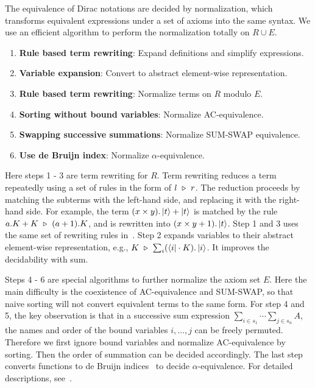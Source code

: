 The equivalence of Dirac notations are decided by normalization, which transforms equivalent expressions under a set of axioms into the same syntax. We use an efficient algorithm to perform the normalization totally on $R \cup E$.

\begin{enumerate}
    \item \textbf{Rule based term rewriting}: Expand definitions and simplify expressions.
    \item \textbf{Variable expansion}: Convert to abstract element-wise representation.
    \item \textbf{Rule based term rewriting}: Normalize terms on \( R \) modulo \( E \).
    \item \textbf{Sorting without bound variables}: Normalize AC-equivalence.
    \item \textbf{Swapping successive summations}: Normalize SUM-SWAP equivalence.
    \item \textbf{Use de Bruijn index}: Normalize \( \alpha \)-equivalence.
\end{enumerate}

Here steps 1 - 3 are term rewriting for $R$. 
Term rewriting reduces a term repeatedly using a set of rules in the form of $l\ \triangleright\ r$. The reduction proceeds by matching the subterms with the left-hand side, and replacing it with the right-hand side. 
For example, the term $(x\times y) . \ket{t} + \ket{t}$ is matched by the rule $a.K + K\ \triangleright\ (a + 1).K$, and is rewritten into $(x\times y + 1) . \ket{t}$.
Step 1 and 3 uses the same set of rewriting rules in~.
Step 2 expands variables to their abstract element-wise representation, e.g., $K \ \triangleright\ \sum_{i} (\bra{i} \cdot K). \ket{i}$. It improves the decidability with sum. 


Steps 4 - 6 are special algorithms to further normalize the axiom set $E$.
Here the main difficulty is the coexistence of AC-equivalence and SUM-SWAP, so that naive sorting will not convert equivalent terms to the same form.
For step 4 and 5, the key observation is that in a successive sum expression \( \sum_{i \in s_1} \cdots \sum_{j \in s_n} A \), the names and order of the bound variables \( i, \dots, j \) can be freely permuted. Therefore we first ignore bound variables and normalize AC-equivalence by sorting. Then the order of summation can be decided accordingly. The last step converts functions to de Bruijn indices~\cite{deBruijn1972lambda} to decide $\alpha$-equivalence. For detailed descriptions, see~.


